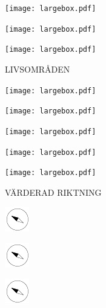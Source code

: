 \documentclass[11pt,titlepage]{article}
\begin{document}
\vspace{7,5mm}

\noindent
\texttt{[image: largebox.pdf]}

\vspace{7,5mm}

\noindent
\texttt{[image: largebox.pdf]}

\vspace{7,5mm}

\noindent
\texttt{[image: largebox.pdf]}

\pagebreak

\small
\hfill LIVSOMRÅDEN

\vspace{6mm}

\noindent
\texttt{[image: largebox.pdf]}

\vspace{7,5mm}

\noindent
\texttt{[image: largebox.pdf]}

\vspace{7,5mm}

\noindent
\texttt{[image: largebox.pdf]}

\vspace{7,5mm}

\noindent
\texttt{[image: largebox.pdf]}

\vspace{7,5mm}

\noindent
\texttt{[image: largebox.pdf]}

\pagebreak

\small %
\hfill VÄRDERAD RIKTNING

\vspace{6mm}

\noindent
\hspace{1mm}\includegraphics[]{compass.pdf}

\vspace{12mm}

\noindent
\hspace{1mm}\includegraphics[]{compass.pdf}

\vspace{12mm}

\noindent
\hspace{1mm}\includegraphics[]{compass.pdf}
\end{document}
